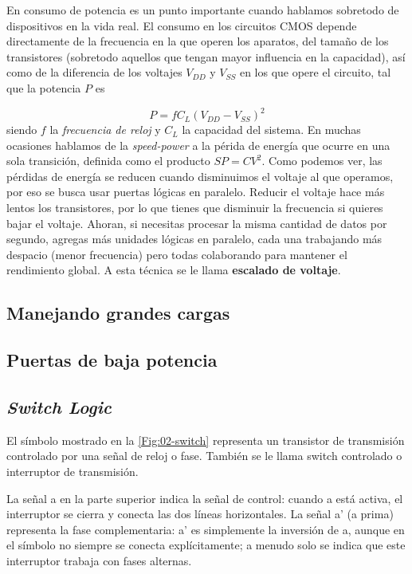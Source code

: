 En consumo de potencia es un punto importante cuando hablamos sobretodo de dispositivos en la vida real. El consumo en los circuitos CMOS depende directamente de la frecuencia en la que operen los aparatos, del tamaño de los transistores (sobretodo aquellos que tengan mayor influencia en la capacidad), así como de la diferencia de los voltajes $V_{DD}$ y $V_{SS}$ en los que opere el circuito, tal que la potencia $P$ es

\begin{equation}
    P = f C_L (V_{DD}-V_{SS})^2
\end{equation}
siendo $f$ la \textit{frecuencia de reloj} y $C_L$ la capacidad del sistema. En muchas ocasiones hablamos de la \textit{speed-power} a la périda de energía que ocurre en una sola transición, definida como el producto $SP=CV^2$. Como podemos ver, las pérdidas de energía se reducen cuando disminuimos el voltaje al que operamos, por eso se busca usar puertas lógicas en paralelo. Reducir el voltaje hace más lentos los transistores, por lo que tienes que disminuir la frecuencia si quieres bajar el voltaje. Ahoran, si necesitas procesar la misma cantidad de datos por segundo, agregas más unidades lógicas en paralelo, cada una trabajando más despacio (menor frecuencia) pero todas colaborando para mantener el rendimiento global. A esta técnica se le llama \textbf{escalado de voltaje}.

\subsection{Manejando grandes cargas}

\subsection{Puertas de baja potencia}

\subsection{\textit{Switch Logic}}


El símbolo mostrado en la  \cref{Fig:02-switch} representa un transistor de transmisión controlado por una señal de reloj o fase. También se le llama switch controlado o interruptor de transmisión.

La señal a en la parte superior indica la señal de control: cuando a está activa, el interruptor se cierra y conecta las dos líneas horizontales. La señal a' (a prima) representa la fase complementaria: a' es simplemente la inversión de a, aunque en el símbolo no siempre se conecta explícitamente; a menudo solo se indica que este interruptor trabaja con fases alternas.

